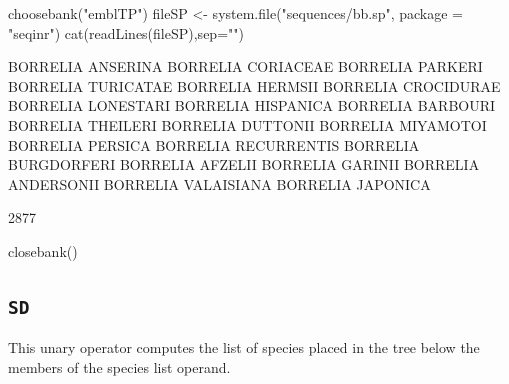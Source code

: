 \documentclass{article}
\begin{document}
\begin{Schunk}
\begin{Sinput}
 choosebank("emblTP")
 fileSP <- system.file("sequences/bb.sp", package = "seqinr")
 cat(readLines(fileSP),sep="\n")
\end{Sinput}
\begin{Soutput}
BORRELIA ANSERINA
BORRELIA CORIACEAE
BORRELIA PARKERI
BORRELIA TURICATAE
BORRELIA HERMSII
BORRELIA CROCIDURAE
BORRELIA LONESTARI
BORRELIA HISPANICA
BORRELIA BARBOURI
BORRELIA THEILERI
BORRELIA DUTTONII
BORRELIA MIYAMOTOI
BORRELIA PERSICA
BORRELIA RECURRENTIS
BORRELIA BURGDORFERI
BORRELIA AFZELII
BORRELIA GARINII
BORRELIA ANDERSONII
BORRELIA VALAISIANA
BORRELIA JAPONICA
\end{Soutput}
\begin{Soutput}
[1] 2877
\end{Soutput}
\begin{Sinput}
 closebank()
\end{Sinput}
\end{Schunk}

\subsection{\texttt{SD}}

This unary operator computes the list of species placed in the tree below the members of the 
species list operand.
\end{document}
